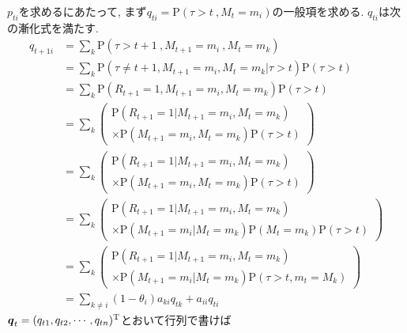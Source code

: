 $ p_{t i} $を求めるにあたって, まず$ q_{t i} = \mathrm{P}(\tau > t\ ,M_t = m_i) $の一般項を求める. 
$ q_{t i} $は次の漸化式を満たす. 
\begin{align}
    q_{t+1 i} & = \! \sum_{k} \mathrm{P}(\tau \! > \! t + 1\ , M_{t+1} \! = \! m_i\ , M_t \! = \! m_k) \\
    & = \! \sum_{k} \mathrm{P}(\tau \! \ne \! t + 1 , M_{t+1} \! = \! m_i , M_t \! = \! m_k | \tau \! > \! t) \mathrm{P}(\tau \! > \! t) \\
    & = \! \sum_{k} \mathrm{P}(R_{t+1} \! = \! 1 , M_{t+1} \! = \! m_i , M_t \! = \! m_k) \mathrm{P}(\tau \! > \! t) \\
    & = \! \sum_{k} \left(
        \begin{array}{l}
            \mathrm{P}(R_{t+1} \! = \! 1 | M_{t+1} \! = \! m_i , M_t \! = \! m_k) \\
            \times \mathrm{P}(M_{t+1} \! = \! m_i , M_t \! = \! m_k) \mathrm{P}(\tau \! > \! t)
        \end{array}
    \right) \\
    & = \! \sum_{k} \left(
        \begin{array}{l}
            \mathrm{P}(R_{t+1} \! = \! 1 | M_{t+1} \! = \! m_i , M_t \! = \! m_k) \\
            \times \mathrm{P}(M_{t+1} \! = \! m_i , M_t \! = \! m_k) \mathrm{P}(\tau \! > \! t)
        \end{array}
    \right) \\
    & = \! \sum_{k} \left(
        \begin{array}{l}
            \mathrm{P}(R_{t+1} \! = \! 1 | M_{t+1} \! = \! m_i , M_t \! = \! m_k) \\
            \times \mathrm{P}(M_{t+1} \! = \! m_i | M_t \! = \! m_k) \mathrm{P}(M_t \! = \! m_k) \mathrm{P}(\tau \! > \! t)
        \end{array}
    \right) \\
    & = \! \sum_{k} \left(
        \begin{array}{l}
            \mathrm{P}(R_{t+1} \! = \! 1 | M_{t+1} \! = \! m_i , M_t \! = \! m_k) \\
            \times \mathrm{P}(M_{t+1} \! = \! m_i | M_t \! = \! m_k) \mathrm{P}(\tau \! > \! t , m_t \! = \! M_k)
        \end{array}
    \right) \\
    & = \! \sum_{k \ne i} (1 - \theta_i) a_{k i} q_{t k} + a_{i i} q_{t i} \label{eq:qti_rec}
\end{align}
$ \boldsymbol{q}_t = (q_{t 1} , q_{t 2} , \cdots , q_{t n})^\mathrm{T} $とおいて行列で書けば
